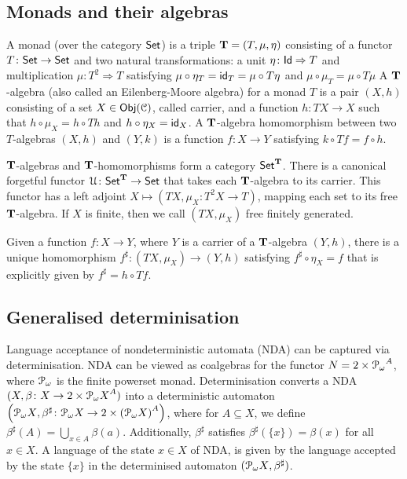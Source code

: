 \subsection{Monads and their algebras}\label{c4:subsec:monads}
A monad (over the category ${\mathsf{Set}}$) is a triple $\mathbf{T} = (T, \mu, \eta)$ consisting of a functor $T \colon {\mathsf{Set}} \to {\mathsf{Set}}$ and two natural transformations: a unit $\eta \colon \mathsf{Id} \Rightarrow T$ and multiplication $\mu \colon T^2 \Rightarrow T$ satisfying $\mu \circ \eta_T = \mathsf{id}_T=  \mu \circ T\eta$ and $\mu \circ \mu_T = \mu \circ T \mu$
A $\mathbf{T}$-algebra (also called an Eilenberg-Moore algebra) for a monad $T$ is a pair $(X, h)$ consisting of a set $X \in \mathsf{Obj}(\mathcal{C})$, called carrier, and a function $h \colon T X \to X$ such that $h \circ \mu_X = h \circ Th$ and $h \circ \eta_X = \mathsf{id}_X$. A $\mathbf{T}$-algebra homomorphism between two $T$-algebras $(X,h)$ and $(Y,k)$ is a function 	$f \colon X \to Y$ satisfying $k \circ Tf = f \circ h$.

$\mathbf{T}$-algebras and $\mathbf{T}$-homomorphisms form a category ${\mathsf{Set}}^{\mathbf{T}}$. There is a canonical forgetful functor $\mathcal{U} \colon {\mathsf{Set}}^{\mathbf{T}} \to {\mathsf{Set}}$ that takes each $\mathbf{T}$-algebra to its carrier. This functor has a left adjoint $X \mapsto (TX, \mu_X \colon T^2 X \to T)$, mapping each set to its free $\mathbf{T}$-algebra. If $X$ is finite, then we call $(TX, \mu_X)$ free finitely generated.

Given a function $f \colon X \to Y$, where $Y$ is a carrier of a $\mathbf{T}$-algebra $(Y, h)$, there is a unique homomorphism $f^\sharp \colon (TX, \mu_X) \to (Y,h)$ satisfying $f^\sharp \circ \eta_X = f$ that is explicitly given by $f^\sharp = h \circ Tf$.

\subsection{Generalised determinisation}\label{sec:c4:generalised_determinisation}
Language acceptance of nondeterministic automata (NDA) can be captured via determinisation. {NDA} can be viewed as coalgebras for the functor $N = 2 \times {\mathcal{P}_\omega}^{A}$, where $\mathcal{P}_\omega$ is the finite powerset monad. Determinisation converts a {NDA} $(X, \beta \colon X \to 2 \times {\mathcal{P}_\omega X}^{A})$ into a deterministic automaton $\left({\mathcal{P}_\omega X}, \beta^{\sharp} \colon {\mathcal{P}_\omega X} \to 2 \times {(\mathcal{P}_\omega X)}^{A} \right)$, where for $A \subseteq X$, we define $\beta^{\sharp}(A) = \bigcup_{x \in A} \beta(a)$. Additionally, $\beta^\sharp$ satisfies $\beta^\sharp(\{x\}) = \beta(x)$ for all $x \in X$. A language of the state $x \in X$ of {NDA}, is given by the language accepted by the state $\{x\}$ in the determinised automaton $({\mathcal{P}_\omega X}, \beta^\sharp)$. 


